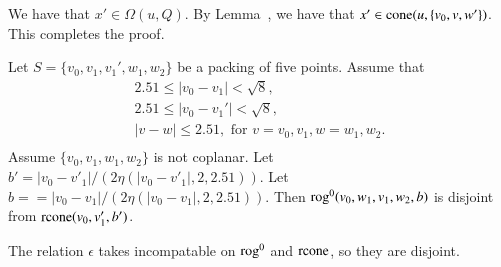 \begin{tarskidata}
\begin{tarski}
\begin{proved}
We have that $x'\in\Omega(u,Q)$.  By Lemma~,
we have that $x'\in{\operatorname{cone}}(u,\{v_0,v,w'\})$.  This completes
the proof.
\swallowed\end{proved}
\end{tarski}






\begin{tarski}

\begin{lemma}
Let $S=\{v_0,v_1,v_1',w_1,w_2\}$ be a packing of five points.
  Assume that
  $$\begin{array}{lll}
  2.51 \le |v_0-v_1| < \sqrt8,\\
  2.51\le |v_0-v_1'| < \sqrt8,\\
  |v-w|\le 2.51, \text{ for } v=v_0,v_1, w=w_1,w_2.\\
  \end{array}
  $$
Assume $\{v_0,v_1,w_1,w_2\}$ is not coplanar.  
Let $b' = |v_0-v'_1|/(2\eta(|v_0-v'_1|,2,2.51))$.  
Let $b== |v_0-v_1|/(2\eta(|v_0-v_1|,2,2.51))$.  
Then
${\operatorname{rog}}^0(v_0,w_1,v_1,w_2,b)$ is disjoint from ${\operatorname{rcone}}(v_0,v_1',b')$.
\end{lemma}


\begin{proved} The relation $\epsilon$ takes incompatable on
${\operatorname{rog}}^0$ and ${\operatorname{rcone}}$, so they are disjoint.
\swallowed\end{proved}
\end{tarski}






\begin{tarski}


\end{tarski}
\end{tarskidata}
